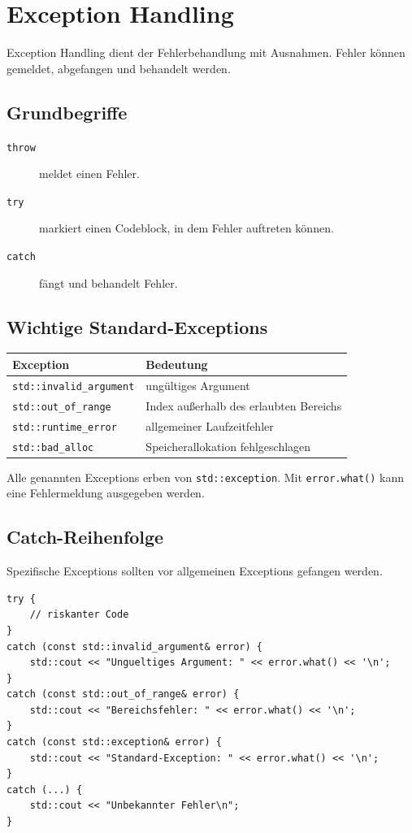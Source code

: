 \documentclass[11pt,a4paper]{article}
\newcommand{\code}[1]{\texttt{#1}}
\begin{document}
\section{Exception Handling}

Exception Handling dient der Fehlerbehandlung mit Ausnahmen. Fehler können gemeldet, abgefangen und behandelt werden.

\subsection{Grundbegriffe}
\begin{description}
  \item[\code{throw}] meldet einen Fehler.
  \item[\code{try}] markiert einen Codeblock, in dem Fehler auftreten können.
  \item[\code{catch}] fängt und behandelt Fehler.
\end{description}

\subsection{Wichtige Standard-Exceptions}
\begin{center}
\begin{tabular}{ll}
\toprule
Exception & Bedeutung \\
\midrule
\code{std::invalid\_argument} & ungültiges Argument \\
\code{std::out\_of\_range} & Index außerhalb des erlaubten Bereichs \\
\code{std::runtime\_error} & allgemeiner Laufzeitfehler \\
\code{std::bad\_alloc} & Speicherallokation fehlgeschlagen \\
\bottomrule
\end{tabular}
\end{center}

Alle genannten Exceptions erben von \code{std::exception}. Mit \code{error.what()} kann eine Fehlermeldung ausgegeben werden.

\subsection{Catch-Reihenfolge}
Spezifische Exceptions sollten vor allgemeinen Exceptions gefangen werden.

\begin{lstlisting}[caption={try-catch-Struktur}]
try {
    // riskanter Code
}
catch (const std::invalid_argument& error) {
    std::cout << "Ungueltiges Argument: " << error.what() << '\n';
}
catch (const std::out_of_range& error) {
    std::cout << "Bereichsfehler: " << error.what() << '\n';
}
catch (const std::exception& error) {
    std::cout << "Standard-Exception: " << error.what() << '\n';
}
catch (...) {
    std::cout << "Unbekannter Fehler\n";
}
\end{lstlisting}
\end{document}
